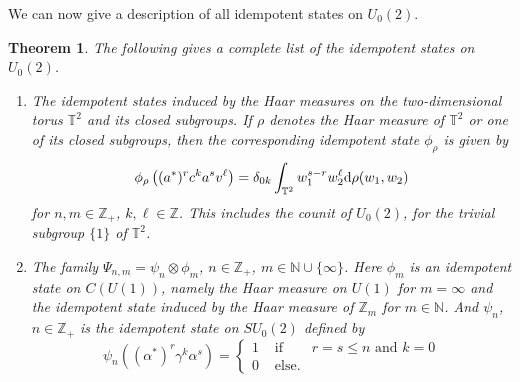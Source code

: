 \documentclass[12pt]{amsart}
\newtheorem{theorem}{Theorem}[section]
\theoremstyle{definition}
\theoremstyle{remark}
\numberwithin{equation}{section}
\begin{document}
We can now give a description of all idempotent states on $U_0(2)$.
\begin{theorem}\label{theo-u02}
The following gives a complete list of the idempotent states on $U_0(2)$.
\begin{enumerate}
\item The idempotent states induced by the Haar measures on the two-dimensional torus $\mathbb{T}^2$ and its 
closed subgroups. If $\rho$ denotes the Haar measure of $\mathbb{T}^2$ or one of its closed subgroups, then the 
corresponding idempotent state $\phi_\rho$ is given by
\[
\phi_\rho\left((a^*)^rc^ka^sv^\ell\right) = \delta_{0k}\int_{\mathbb{T}^2} w_1^{s-r}
  w_2^\ell {\rm d}\rho(w_1,w_2)
\]
for $n,m\in\mathbb{Z}_+$, $k,\ell\in\mathbb{Z}$. This includes the counit of $U_0(2)$, for the trivial subgroup 
$\{1\}$ of $\mathbb{T}^2$. \item The family $\Psi_{n,m}=\psi_n\otimes \phi_m$, $n\in\mathbb{Z}_+$, 
$m\in\mathbb{N}\cup\{\infty\}$. Here $\phi_m$ is an idempotent state on $C(U(1))$, namely the Haar measure on 
$U(1)$ for $m=\infty$ and the idempotent state induced by the Haar measure of $\mathbb{Z}_m$ for 
$m\in\mathbb{N}$. And $\psi_n$, $n\in\mathbb{Z}_+$ is the idempotent state on $SU_0(2)$ defined by
\[
\psi_n\left((\alpha^*)^r\gamma^k\alpha^s\right) = \left\{\begin{array}{cll}
1 & \mbox{ if } & r=s\le n \mbox{ and }k=0 \\
0 & \mbox{ else}.&
\end{array}\right.
\]
\end{enumerate}
\end{theorem}
\end{document}
